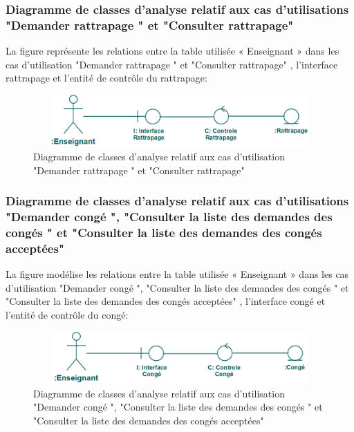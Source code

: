 \documentclass[12 pt ]{report}
\begin{document}
\subsubsection{Diagramme de classes d’analyse relatif aux cas d’utilisations "Demander rattrapage " et "Consulter rattrapage" }
La figure  représente les relations entre la table utilisée « Enseignant » dans les cas d’utilisation "Demander rattrapage " et "Consulter rattrapage" , l’interface  rattrapage et  l'entité de  contrôle du rattrapage:
\begin{figure}[h]
\begin{center}
\includegraphics[width= 12cm , height =2cm]{cdc.png}
\caption{Diagramme de classes d’analyse relatif aux cas d’utilisation "Demander rattrapage " et "Consulter rattrapage" }
\end{center}
\end{figure} 
\subsubsection{Diagramme de classes d’analyse relatif aux cas d’utilisations "Demander congé ", "Consulter la liste des demandes des congés " et "Consulter la liste des demandes des congés acceptées"}
La figure  modélise les relations entre la table utilisée « Enseignant » dans les cas d’utilisation "Demander congé ", "Consulter la liste des demandes des congés " et "Consulter la liste des demandes 
 des congés acceptées" , l’interface  congé et  l'entité de  contrôle du congé:
\begin{figure}[h]
\begin{center}
\includegraphics[width= 12cm , height =2cm]{cdr.png}
\caption{Diagramme de classes d’analyse relatif aux cas d’utilisation "Demander congé ", "Consulter la liste des demandes des congés " et "Consulter la liste des demandes 
 des congés acceptées"}
\end{center}
\end{figure}
\end{document}
